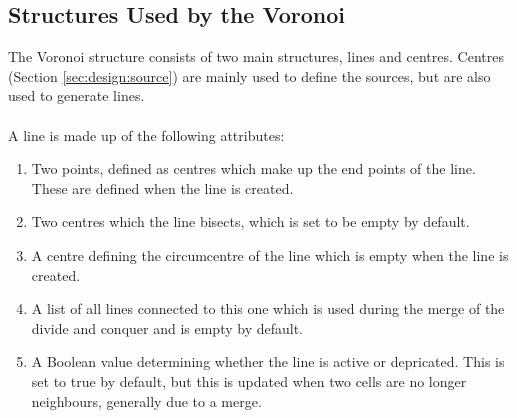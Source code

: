 \subsection{Structures Used by the Voronoi}\label{sec:des:struct}
The Voronoi structure consists of two main structures, lines and centres. Centres (Section \ref{sec:design:source}) are mainly used to define the sources, but are also used to generate lines.
\\
\\
A line is made up of the following attributes:
\begin{enumerate}
\item Two points, defined as centres which make up the end points of the line. These are defined when the line is created.
\item Two centres which the line bisects, which is set to be empty by default.
\item A centre defining the circumcentre of the line which is empty when the line is created.
\item A list of all lines connected to this one which is used during the merge of the divide and conquer and is empty by default.
\item A Boolean value determining whether the line is active or depricated. This is set to true by default, but this is updated when two cells are no longer neighbours, generally due to a merge.
\end{enumerate}

